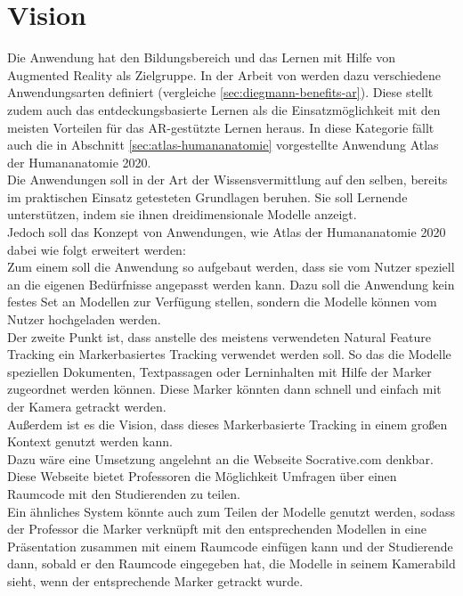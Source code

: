 \section{Vision}\label{sec:vision}
Die Anwendung hat den Bildungsbereich und das Lernen mit Hilfe von Augmented Reality als Zielgruppe. In der Arbeit von \citeauthor{diegmann:benefits-ar} werden dazu verschiedene Anwendungsarten definiert (vergleiche \ref{sec:diegmann-benefits-ar}). Diese stellt zudem auch das entdeckungsbasierte Lernen als die Einsatzmöglichkeit mit den meisten Vorteilen für das AR-gestützte Lernen heraus. In diese Kategorie fällt auch die in Abschnitt \ref{sec:atlas-humananatomie} vorgestellte Anwendung \glqq Atlas der Humananatomie 2020\grqq. \\
Die Anwendungen soll in der Art der Wissensvermittlung auf den selben, bereits im praktischen Einsatz getesteten Grundlagen beruhen. Sie soll Lernende unterstützen, indem sie ihnen dreidimensionale Modelle anzeigt. \\
Jedoch soll das Konzept von Anwendungen, wie \glqq Atlas der Humananatomie 2020\grqq{} dabei wie folgt erweitert werden:\\
Zum einem soll die Anwendung so aufgebaut werden, dass sie vom Nutzer speziell an die eigenen Bedürfnisse angepasst werden kann. Dazu soll die Anwendung kein festes Set an Modellen zur Verfügung stellen, sondern die Modelle können vom Nutzer hochgeladen werden. \\
Der zweite Punkt ist, dass anstelle des meistens verwendeten Natural Feature Tracking ein Markerbasiertes Tracking verwendet werden soll. So das die Modelle speziellen Dokumenten, Textpassagen oder Lerninhalten mit Hilfe der Marker zugeordnet werden können. Diese Marker könnten dann schnell und einfach mit der Kamera getrackt werden.\\
Außerdem ist es die Vision, dass dieses Markerbasierte Tracking in einem großen Kontext genutzt werden kann. \\
Dazu wäre eine Umsetzung angelehnt an die Webseite Socrative.com denkbar. Diese Webseite bietet Professoren die Möglichkeit Umfragen über einen Raumcode mit den Studierenden zu teilen. \\
Ein ähnliches System könnte auch zum Teilen der Modelle genutzt werden, sodass der Professor die Marker verknüpft mit den entsprechenden Modellen in eine Präsentation zusammen mit einem Raumcode einfügen kann und der Studierende dann, sobald er den Raumcode eingegeben hat, die Modelle in seinem Kamerabild sieht, wenn der entsprechende Marker getrackt wurde.\\
